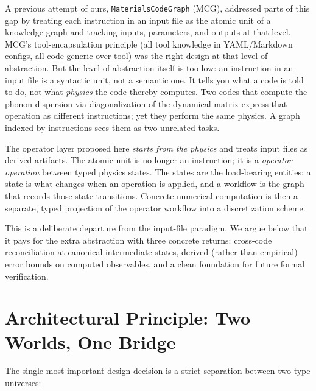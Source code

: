 \documentclass[11pt,a4paper]{article}
\begin{document}
A previous attempt of ours, \texttt{MaterialsCodeGraph} (MCG), addressed parts of this gap by
treating each instruction in an input file as the atomic unit of a knowledge graph and tracking
inputs, parameters, and outputs at that level. MCG's tool-encapsulation principle (all tool
knowledge in YAML/Markdown configs, all code generic over tool) was the right design at that
level of abstraction. But the level of abstraction itself is too low: an instruction in an input
file is a syntactic unit, not a semantic one. It tells you what a code is told to do, not what
\emph{physics} the code thereby computes. Two codes that compute the phonon dispersion via
diagonalization of the dynamical matrix express that operation as different instructions; yet
they perform the same physics. A graph indexed by instructions sees them as two unrelated tasks.

\medskip

The operator layer proposed here \emph{starts from the physics} and treats input files as derived
artifacts. The atomic unit is no longer an instruction; it is a \emph{operator operation} between
typed physics states. The states are the load-bearing entities: a state is what changes when an
operation is applied, and a workflow is the graph that records those state transitions. Concrete
numerical computation is then a separate, typed projection of the operator workflow into a
discretization scheme.

This is a deliberate departure from the input-file paradigm. We argue below that it pays for the
extra abstraction with three concrete returns: cross-code reconciliation at canonical intermediate
states, derived (rather than empirical) error bounds on computed observables, and a clean
foundation for future formal verification.

\section{Architectural Principle: Two Worlds, One Bridge}
\label{sec:principle}

The single most important design decision is a strict separation between two type universes:
\end{document}
